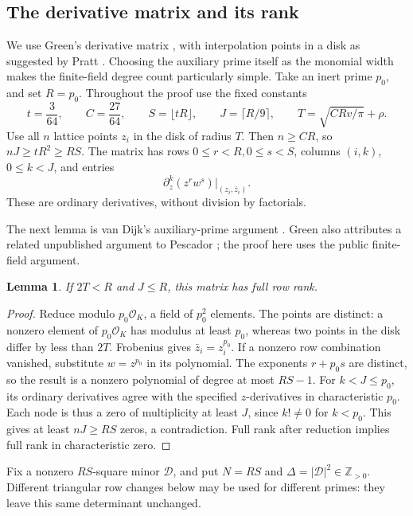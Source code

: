\documentclass[11pt]{article}
\newtheorem{lemma}[theorem]{Lemma}
\newcommand{\Z}{\mathbb Z}
\newcommand{\OK}{\mathcal O_K}
\begin{document}
\subsection{The derivative matrix and its rank}\label{rank}
We use Green's derivative matrix \cite{green}, with interpolation points
in a disk as suggested by Pratt \cite{pratt}. Choosing the auxiliary
prime itself as the monomial width makes the finite-field degree count
particularly simple.
Take an inert prime \(p_0\), and set \(R=p_0\).
Throughout the proof use the fixed constants
\begin{equation}\label{fixed}
 t=\frac3{64},\qquad C=\frac{27}{64},\qquad
 S=\lfloor tR\rfloor,\qquad J=\lceil R/9\rceil,
 \qquad T=\sqrt{CRv/\pi}+\rho.
\end{equation}
Use all \(n\) lattice points \(z_i\) in the disk of radius \(T\).
Then \(n\ge CR\), so \(nJ\ge tR^2\ge RS\).
The matrix has rows \(0\le r<R,0\le s<S\), columns \((i,k)\),
\(0\le k<J\), and entries
\[
 \partial_z^k(z^r w^s)\big|_{(z_i,\bar z_i)}.
\]
These are ordinary derivatives, without division by factorials.

The next lemma is van Dijk's auxiliary-prime argument \cite{vandijk}.
Green also attributes a related unpublished argument to Pescador
\cite{greencomment}; the proof here uses the public finite-field argument.

\begin{lemma}\label{nonzero}
If \(2T<R\) and \(J\le R\), this matrix has full row rank.
\end{lemma}
\begin{proof}
Reduce modulo \(p_0\OK\), a field of \(p_0^2\) elements. The points
are distinct: a nonzero element of \(p_0\OK\) has modulus at least
\(p_0\), whereas two points in the disk differ by less than \(2T\).
Frobenius gives \(\bar z_i=z_i^{p_0}\).
If a nonzero row combination vanished, substitute \(w=z^{p_0}\) in
its polynomial. The exponents \(r+p_0s\) are distinct, so the result
is a nonzero polynomial of degree at most \(RS-1\). For \(k<J\le p_0\),
its ordinary derivatives agree with the specified \(z\)-derivatives
in characteristic \(p_0\). Each node is thus a zero of multiplicity
at least \(J\), since \(k!\ne0\) for \(k<p_0\). This gives at least
\(nJ\ge RS\) zeros, a contradiction. Full rank after reduction
implies full rank in characteristic zero.
\end{proof}

Fix a nonzero \(RS\)-square minor \(\mathcal D\), and put
\(N=RS\) and \(\Delta=|\mathcal D|^2\in\Z_{>0}\).
Different triangular row changes below may be used for different
primes: they leave this same determinant unchanged.
\end{document}
